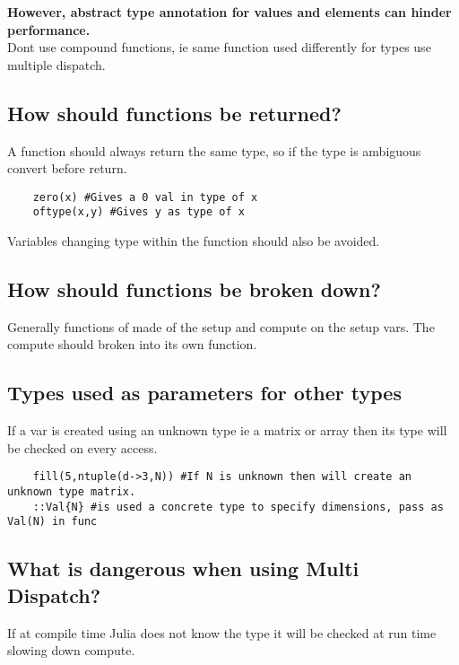\documentclass[11pt]{scrartcl} %
\begin{document}
\textbf{However, abstract type annotation for values and elements can hinder performance.}\\

Dont use compound functions, ie same function used differently for types use multiple dispatch.

\subsection{How should functions be returned?}

A function should always return the same type, so if the type is ambiguous convert before return.

\begin{verbatim}
	zero(x) #Gives a 0 val in type of x
	oftype(x,y) #Gives y as type of x
\end{verbatim}

Variables changing type within the function should also be avoided. 

\subsection{How should functions be broken down?}

Generally functions of made of the setup and compute on the setup vars. The compute should
broken into its own function.

\subsection{Types used as parameters for other types}

If a var is created using an unknown type ie a matrix or array then its type will be checked on
every access.

\begin{verbatim}
	fill(5,ntuple(d->3,N)) #If N is unknown then will create an unknown type matrix.
	::Val{N} #is used a concrete type to specify dimensions, pass as Val(N) in func
\end{verbatim}

\subsection{What is dangerous when using Multi Dispatch?}

If at compile time Julia does not know the type it will be checked at run time slowing down
compute.
\end{document}
